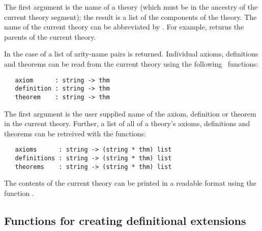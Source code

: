 \noindent The first argument is the name of a theory (which must be in the
ancestry of the current theory segment); the result is a list of the
components of the theory. The name of the current theory can be
abbreviated by .
%
%
For example,  returns the parents of the current
theory.

In the case of  a list of arity-name pairs is returned.
Individual axioms, definitions and theorems can be read from the
current theory using the following \ML\ functions:

\begin{boxed}
\begin{verbatim}
   axiom      : string -> thm
   definition : string -> thm
   theorem    : string -> thm
\end{verbatim}
\end{boxed}

\noindent The first argument is the user supplied name of the axiom,
definition or theorem in the current theory.  Further, a list of all
of a theory's axioms, definitions and theorems can be retreived with
the \ML{} functions:

\begin{boxed}
\begin{verbatim}
   axioms      : string -> (string * thm) list
   definitions : string -> (string * thm) list
   theorems    : string -> (string * thm) list
\end{verbatim}
\end{boxed}

The contents of the current theory can be printed in a readable format
using the function .
%

\subsection{Functions for creating definitional extensions}
\label{avra_definitional}

